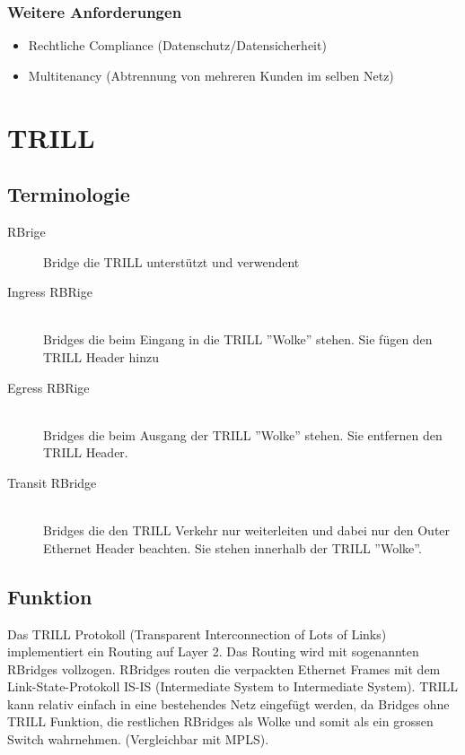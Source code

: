 \subsubsection{Weitere Anforderungen }
\begin{itemize}
	\item Rechtliche Compliance (Datenschutz/Datensicherheit)
	\item Multitenancy (Abtrennung von mehreren Kunden im selben Netz)
\end{itemize}


\section{TRILL}\label{sec:trill}
\subsection{Terminologie}
\begin{description}
	\item[RBrige] Bridge die TRILL unterstützt und verwendent
	\item[Ingress RBRige] \hfill \\
	Bridges die beim Eingang in die TRILL ''Wolke'' stehen. Sie fügen den TRILL Header hinzu
	\item[Egress RBRige] \hfill \\
	Bridges die beim Ausgang der TRILL ''Wolke'' stehen. Sie entfernen den TRILL Header.
	\item[Transit RBridge]  \hfill \\
	Bridges die den TRILL Verkehr nur weiterleiten und dabei nur den Outer Ethernet Header beachten. Sie stehen innerhalb der TRILL ''Wolke''.
\end{description}

\subsection{Funktion} %
Das TRILL Protokoll  (Transparent Interconnection of Lots of Links) implementiert ein Routing auf Layer 2. Das Routing wird mit sogenannten RBridges vollzogen. RBridges routen die verpackten Ethernet Frames mit dem Link-State-Protokoll IS-IS (Intermediate System to Intermediate System). TRILL kann relativ einfach in eine bestehendes Netz eingefügt werden, da Bridges ohne TRILL Funktion, die restlichen RBridges als Wolke und somit als ein grossen Switch wahrnehmen. (Vergleichbar mit MPLS). \\ 

